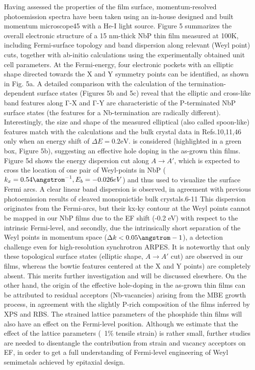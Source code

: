 Having assessed the properties of the film surface, momentum-resolved 
photoemission spectra have been taken using an in-house designed and built 
momentum microscope45 with a He-I light source. Figure 5 summarizes the
overall electronic structure of a 15 nm-thick NbP thin film measured at 
100K, including Fermi-surface topology and band dispersion along relevant 
(Weyl point) cuts, together with ab-initio calculations using the experimentally 
obtained unit cell parameters. At the Fermi-energy, four electronic pockets with 
an elliptic shape directed towards the X and Y symmetry points can be identified, 
as shown in Fig. 5a.  A detailed comparison with the calculation of the 
termination-dependent surface states (Figures 5b and 5c) reveal that the elliptic 
and cross-like band features along Γ-X and Γ-Y are characteristic of the P-terminated 
NbP surface states (the features for a Nb-termination are radically different). 
Interestingly, the size and shape of the measured elliptical (also called spoon-like) 
features match with the calculations and the bulk crystal data in Refs.10,11,46 only 
when an energy shift of $\Delta E = 0.2 \text{eV}$. is considered (highlighted 
in a green box, Figure 5b), suggesting an effective hole doping in the as-grown 
thin films.  Figure 5d shows the energy dispersion cut along $A \rightarrow A'$, 
which is expected to cross the location of one pair of Weyl-points in NbP 
($k_x=0.54 \angstrom^{-1}, E_b = -0.026 eV$) and thus used to visualize the surface 
Fermi arcs. A clear linear band dispersion is observed, in agreement with previous 
photoemission results of cleaved monopnictide bulk crystals.6-11  This dispersion 
originates from the Fermi-arcs, but their kx-ky contour at the Weyl points cannot 
be mapped in our NbP films due to the EF shift (-0.2 eV) with respect to the intrinsic 
Fermi-level, and secondly, due the intrinsically short separation of the Weyl points 
in momentum space ($\Delta k < 0.05 \angstrom-1$), a detection challenge even for high-resolution 
synchrotron ARPES. It is noteworthy that only these topological surface states (elliptic 
shape, $A \rightarrow A'$ cut) are observed in our films, whereas the bowtie features
centered at the X and Y points) are completely absent.  This merits further investigation
and will be discussed elsewhere. On the other hand, the origin of the effective hole-doping 
in the as-grown thin films can be attributed to residual acceptors (Nb-vacancies) arising 
from the MBE growth process, in agreement with the slightly P-rich composition of the films 
inferred by XPS and RBS.  The strained lattice parameters of the phosphide thin films 
will also have an effect on the Fermi-level position. Although we estimate that the effect 
of the lattice parameters (~1\% tensile strain) is rather small, further studies are needed 
to disentangle the contribution from strain and vacancy acceptors on EF, in order to get a 
full understanding of Fermi-level engineering of Weyl semimetals achieved by epitaxial design.
